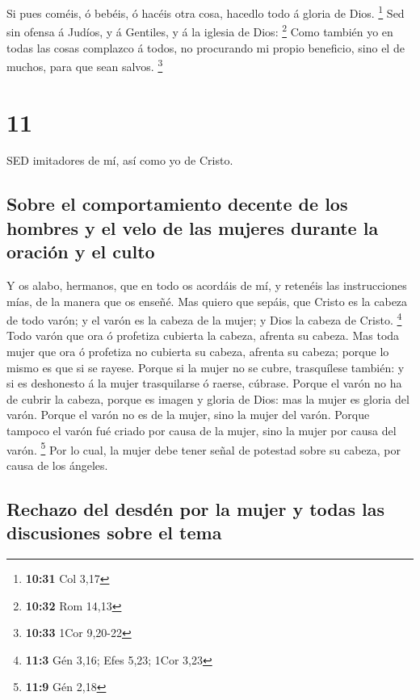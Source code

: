  Si pues coméis, ó bebéis, ó hacéis otra cosa, hacedlo todo
á gloria de Dios. \footnote{\textbf{10:31} Col 3,17}  Sed
sin ofensa á Judíos, y á Gentiles, y á la iglesia de Dios: \footnote{\textbf{10:32}
  Rom 14,13}  Como también yo en todas las cosas complazco
á todos, no procurando mi propio beneficio, sino el de muchos, para que
sean salvos. \footnote{\textbf{10:33} 1Cor 9,20-22}

\hypertarget{section-10}{%
\section{11}\label{section-10}}

 SED imitadores de mí, así como yo de Cristo.

\hypertarget{sobre-el-comportamiento-decente-de-los-hombres-y-el-velo-de-las-mujeres-durante-la-oraciuxf3n-y-el-culto}{%
\subsection{Sobre el comportamiento decente de los hombres y el velo de
las mujeres durante la oración y el
culto}\label{sobre-el-comportamiento-decente-de-los-hombres-y-el-velo-de-las-mujeres-durante-la-oraciuxf3n-y-el-culto}}

 Y os alabo, hermanos, que en todo os acordáis de mí, y
retenéis las instrucciones mías, de la manera que os enseñé.
 Mas quiero que sepáis, que Cristo es la cabeza de todo
varón; y el varón es la cabeza de la mujer; y Dios la cabeza de Cristo.
\footnote{\textbf{11:3} Gén 3,16; Efes 5,23; 1Cor 3,23} 
Todo varón que ora ó profetiza cubierta la cabeza, afrenta su cabeza.
 Mas toda mujer que ora ó profetiza no cubierta su cabeza,
afrenta su cabeza; porque lo mismo es que si se rayese. 
Porque si la mujer no se cubre, trasquílese también: y si es deshonesto
á la mujer trasquilarse ó raerse, cúbrase.  Porque el varón
no ha de cubrir la cabeza, porque es imagen y gloria de Dios: mas la
mujer es gloria del varón.  Porque el varón no es de la
mujer, sino la mujer del varón.  Porque tampoco el varón fué
criado por causa de la mujer, sino la mujer por causa del varón.
\footnote{\textbf{11:9} Gén 2,18}  Por lo cual, la mujer
debe tener señal de potestad sobre su cabeza, por causa de los ángeles.

\hypertarget{rechazo-del-desduxe9n-por-la-mujer-y-todas-las-discusiones-sobre-el-tema}{%
\subsection{Rechazo del desdén por la mujer y todas las discusiones
sobre el
tema}\label{rechazo-del-desduxe9n-por-la-mujer-y-todas-las-discusiones-sobre-el-tema}}

